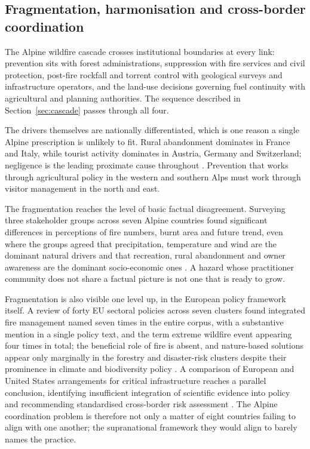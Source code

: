 \documentclass[11pt,a4paper]{article}
\begin{document}
\subsection{Fragmentation, harmonisation and cross-border coordination}

The Alpine wildfire cascade crosses institutional boundaries at every link: prevention sits with forest administrations, suppression with fire services and civil protection, post-fire rockfall and torrent control with geological surveys and infrastructure operators, and the land-use decisions governing fuel continuity with agricultural and planning authorities. The sequence described in Section~\ref{sec:cascade} passes through all four.

The drivers themselves are nationally differentiated, which is one reason a single Alpine prescription is unlikely to fit. Rural abandonment dominates in France and Italy, while tourist activity dominates in Austria, Germany and Switzerland; negligence is the leading proximate cause throughout \citep{muller_forest_2020}. Prevention that works through agricultural policy in the western and southern Alps must work through visitor management in the north and east.

The fragmentation reaches the level of basic factual disagreement. Surveying three stakeholder groups across seven Alpine countries found significant differences in perceptions of fire numbers, burnt area and future trend, even where the groups agreed that precipitation, temperature and wind are the dominant natural drivers and that recreation, rural abandonment and owner awareness are the dominant socio-economic ones \citep{hoang_stakeholders_2026}. A hazard whose practitioner community does not share a factual picture is not one that is ready to grow.

Fragmentation is also visible one level up, in the European policy framework itself. A review of forty EU sectoral policies across seven clusters found integrated fire management named seven times in the entire corpus, with a substantive mention in a single policy text, and the term extreme wildfire event appearing four times in total; the beneficial role of fire is absent, and nature-based solutions appear only marginally in the forestry and disaster-risk clusters despite their prominence in climate and biodiversity policy \citep{plana_framing_2024}. A comparison of European and United States arrangements for critical infrastructure reaches a parallel conclusion, identifying insufficient integration of scientific evidence into policy and recommending standardised cross-border risk assessment \citep{kalapodis_towards_2025}. The Alpine coordination problem is therefore not only a matter of eight countries failing to align with one another; the supranational framework they would align to barely names the practice.
\end{document}
